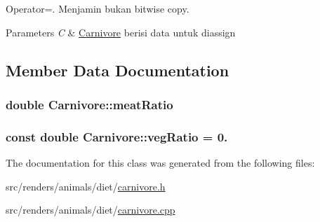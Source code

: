 Operator=. Menjamin bukan bitwise copy. 


\begin{DoxyParams}{Parameters}
{\em C} & \hyperlink{classCarnivore}{Carnivore} berisi data untuk diassign \\
\hline
\end{DoxyParams}


\subsection{Member Data Documentation}
\subsubsection[{\texorpdfstring{meat\+Ratio}{meatRatio}}]{\setlength{\rightskip}{0pt plus 5cm}double Carnivore\+::meat\+Ratio\hspace{0.3cm}{\ttfamily [protected]}}\hypertarget{classCarnivore_a7fded43c2f22eab35e2e6f16ae155f27}{}\label{classCarnivore_a7fded43c2f22eab35e2e6f16ae155f27}
\subsubsection[{\texorpdfstring{veg\+Ratio}{vegRatio}}]{\setlength{\rightskip}{0pt plus 5cm}const double Carnivore\+::veg\+Ratio = 0.\hspace{0.3cm}{\ttfamily [protected]}}\hypertarget{classCarnivore_ab4047f87dae34ec4667f42e1efd57d93}{}\label{classCarnivore_ab4047f87dae34ec4667f42e1efd57d93}


The documentation for this class was generated from the following files\+:\begin{DoxyCompactItemize}
\item 
src/renders/animals/diet/\hyperlink{carnivore_8h}{carnivore.\+h}\item 
src/renders/animals/diet/\hyperlink{carnivore_8cpp}{carnivore.\+cpp}\end{DoxyCompactItemize}
